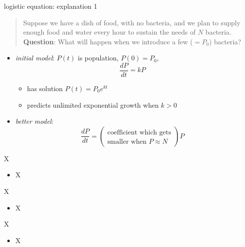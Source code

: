 \documentclass{beamer}
\begin{document}
\begin{frame}{logistic equation: explanation 1}

\begin{quotation}
\noindent Suppose we have a dish of food, with no bacteria, and we plan to supply enough food and water every hour to sustain the needs of $N$ bacteria.  \textbf{Question}: What will happen when we introduce a few ($=P_0$) bacteria?
\end{quotation}

\begin{itemize}
\item \emph{initial model}:  $P(t)$ is population, $P(0)=P_0$, 
    $$\frac{dP}{dt} = k P$$

\vspace{-2mm}
    \begin{itemize}
    \item has solution $P(t) = P_0 e^{kt}$
    \item predicts unlimited exponential growth when $k>0$
    \end{itemize}
\item \emph{better model}:
    $$\frac{dP}{dt} = \left(\begin{matrix} \text{coefficient which gets} \\ \text{smaller when } P\approx N\end{matrix} \right) P$$
    
\end{itemize}
\end{frame}



\begin{frame}{X}

\begin{itemize}
\item X
\end{itemize}
\end{frame}


\begin{frame}{X}

\begin{itemize}
\item X
\end{itemize}
\end{frame}


\begin{frame}{X}

\begin{itemize}
\item X
\end{itemize}
\end{frame}
\end{document}
